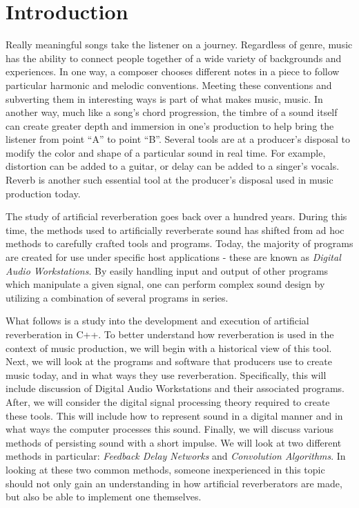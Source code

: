 \chapter{Introduction}\label{intro}
\hspace*{-0.155cm}Really meaningful songs take the listener on a journey. Regardless of genre, music has the ability to connect people together of a wide variety of backgrounds and experiences. In one way, a composer chooses different notes in a piece to follow particular harmonic and melodic conventions. Meeting these conventions and subverting them in interesting ways is part of what makes music, music. In another way, much like a song's chord progression, the timbre of a sound itself can create greater depth and immersion in one's production to help bring the listener from point ``A'' to point ``B''. Several tools are at a producer's disposal to modify the color and shape of a particular sound in real time. For example, distortion can be added to a guitar, or delay can be added to a singer's vocals. Reverb is another such essential tool at the producer's disposal used in music production today.

The study of artificial reverberation goes back over a hundred years. During this time, the methods used to artificially reverberate sound has shifted from ad hoc methods to carefully crafted tools and programs. Today, the majority of programs are created for use under specific host applications - these are known as \textit{Digital Audio Workstations}. By easily handling input and output of other programs which manipulate a given signal, one can perform complex sound design by utilizing a combination of several programs in series.

What follows is a study into the development and execution of artificial reverberation in C++. To better understand how reverberation is used in the context of music production, we will begin with a historical view of this tool. Next, we will look at the programs and software that producers use to create music today, and in what ways they use reverberation. Specifically, this will include discussion of Digital Audio Workstations and their associated programs. After, we will consider the digital signal processing theory required to create these tools. This will include how to represent sound in a digital manner and in what ways the computer processes this sound. Finally, we will discuss various methods of persisting sound with a short impulse. We will look at two different methods in particular: \textit{Feedback Delay Networks} and \textit{Convolution Algorithms}. In looking at these two common methods, someone inexperienced in this topic should not only gain an understanding in how artificial reverberators are made, but also be able to implement one themselves.
